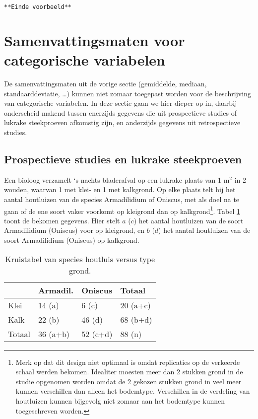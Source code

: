\documentclass[12pt,dutch,coursenotes]{book}
\let\rmarkdownfootnote\footnote%
\def\footnote{\protect\rmarkdownfootnote}
\theoremstyle{definition}
\theoremstyle{definition}
\theoremstyle{definition}
\theoremstyle{remark}
\let\BeginKnitrBlock\begin \let\EndKnitrBlock\end
\begin{document}
\texttt{**Einde\ voorbeeld**}

\section{Samenvattingsmaten voor categorische
variabelen}\label{sec:explCatVar}

De samenvattingsmaten uit de vorige sectie (gemiddelde, mediaan,
standaarddeviatie, \ldots{}) kunnen niet zomaar toegepast worden voor de
beschrijving van categorische variabelen. In deze sectie gaan we hier
dieper op in, daarbij onderscheid makend tussen enerzijds gegevens die
uit prospectieve studies of lukrake steekproeven afkomstig zijn, en
anderzijds gegevens uit retrospectieve studies.

\subsection{Prospectieve studies en lukrake
steekproeven}\label{prospectieve-studies-en-lukrake-steekproeven}

\BeginKnitrBlock{example}[Houtluizen]
\protect\hypertarget{exm:unnamed-chunk-55}{}{\label{exm:unnamed-chunk-55}
\iffalse (Houtluizen) \fi{} }
\EndKnitrBlock{example}

Een bioloog verzamelt `s nachts bladerafval op een lukrake plaats van 1
m\(^2\) in 2 wouden, waarvan 1 met klei- en 1 met kalkgrond. Op elke
plaats telt hij het aantal houtluizen van de species Armadilidium of
Oniscus, met als doel na te gaan of de ene soort vaker voorkomt op
kleigrond dan op kalkgrond\footnote{Merk op dat dit design niet optimaal
  is omdat replicaties op de verkeerde schaal werden bekomen. Idealiter
  moesten meer dan 2 stukken grond in de studie opgenomen worden omdat
  de 2 gekozen stukken grond in veel meer kunnen verschillen dan alleen
  het bodemtype. Verschillen in de verdeling van houtluizen kunnen
  bijgevolg niet zomaar aan het bodemtype kunnen toegeschreven worden.}.
Tabel \ref{tab:cox} toont de bekomen gegevens. Hier stelt \(a\) (\(c\))
het aantal houtluizen van de soort Armadilidium (Oniscus) voor op
kleigrond, en \(b\) (\(d\)) het aantal houtluizen van de soort
Armadilidium (Oniscus) op kalkgrond.

\begin{table}[t]

\caption{\label{tab:cox}Kruistabel van species houtluis versus type grond.}
\centering
\begin{tabular}{llll}
\toprule
  & Armadil. & Oniscus & Totaal\\
\midrule
Klei & 14 (a) & 6 (c) & 20 (a+c)\\
Kalk & 22 (b) & 46 (d) & 68 (b+d)\\
Totaal & 36 (a+b) & 52 (c+d) & 88 (n)\\
\bottomrule
\end{tabular}
\end{table}
\end{document}
